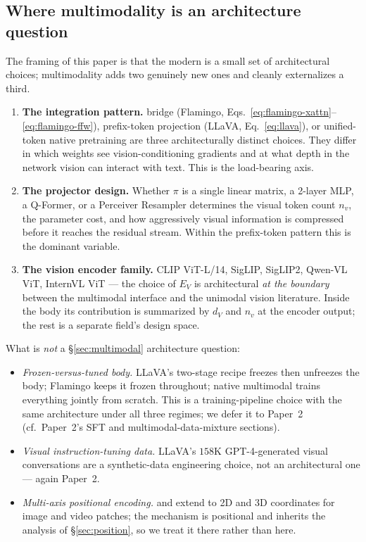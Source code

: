 \subsection{Where multimodality is an architecture question}
\label{sec:multimodal-arch-vs-not}

The framing of this paper is that the modern  is a small
set of architectural choices; multimodality adds two genuinely new
ones and cleanly externalizes a third.

\begin{enumerate}
\item \textbf{The integration pattern.}  bridge
(Flamingo, Eqs.~\eqref{eq:flamingo-xattn}--\eqref{eq:flamingo-ffw}),
prefix-token projection (LLaVA, Eq.~\eqref{eq:llava}), or unified-token
native pretraining are three architecturally distinct choices. They
differ in which weights see vision-conditioning gradients and at what
depth in the network vision can interact with text. This is the
load-bearing axis.

\item \textbf{The projector design.} Whether $\pi$ is a single linear
matrix, a 2-layer MLP, a Q-Former, or a Perceiver Resampler determines
the visual token count $n_v$, the parameter cost, and how aggressively
visual information is compressed before it reaches the residual
stream. Within the prefix-token pattern this is the dominant variable.

\item \textbf{The vision encoder family.} CLIP ViT-L/14, SigLIP,
SigLIP2, Qwen-VL ViT, InternVL ViT --- the choice of $E_V$ is
architectural \emph{at the boundary} between the multimodal interface
and the unimodal vision literature. Inside the  body its
contribution is summarized by $d_V$ and $n_v$ at the encoder output;
the rest is a separate field's design space.
\end{enumerate}

What is \emph{not} a §\ref{sec:multimodal} architecture question:

\begin{itemize}
\item \emph{Frozen-versus-tuned  body.} LLaVA's two-stage recipe
freezes then unfreezes the  body; Flamingo keeps it frozen
throughout; native multimodal trains everything jointly from scratch.
This is a training-pipeline choice with the same architecture under
all three regimes; we defer it to Paper~2 (cf.\ Paper~2's SFT and
multimodal-data-mixture sections).
\item \emph{Visual instruction-tuning data.} LLaVA's
$158\text{K}$ GPT-4-generated visual conversations
\citep[\S 3]{llava2023} are a synthetic-data engineering choice, not
an architectural one --- again Paper~2.
\item \emph{Multi-axis positional encoding.}  and 
extend  to 2D and 3D coordinates for image and video patches; the
mechanism is positional and inherits the analysis of
\S\ref{sec:position}, so we treat it there rather than here.
\end{itemize}

